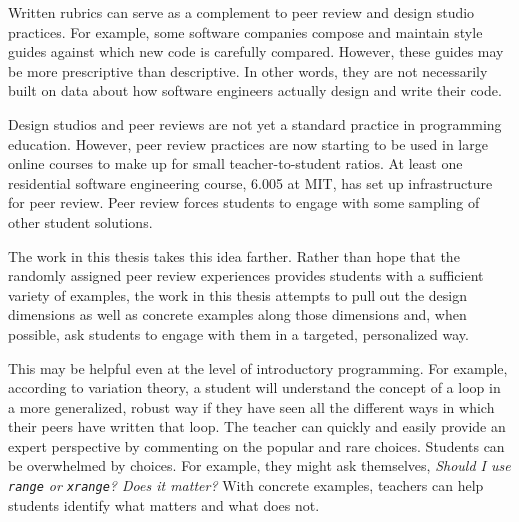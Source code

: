 Written rubrics can serve as a complement to peer review and design studio practices. For example, some software companies compose and maintain style guides against which new code is carefully compared. However, these guides may be more prescriptive than descriptive. In other words, they are not necessarily built on data about how software engineers actually design and write their code. %

Design studios and peer reviews are not yet a standard practice in programming education. However, peer review practices are now starting to be used in large online courses to make up for small teacher-to-student ratios. At least one residential software engineering course, 6.005 at MIT, has set up infrastructure for peer review. Peer review forces students to engage with some sampling of other student solutions. 

The work in this thesis takes this idea farther. Rather than hope that the randomly assigned peer review experiences provides students with a sufficient variety of examples, the work in this thesis attempts to pull out the design dimensions as well as concrete examples along those dimensions and, when possible, ask students to engage with them in a targeted, personalized way. 

This may be helpful even at the level of introductory programming. For example, according to variation theory, a student will understand the concept of a loop in a more generalized, robust way if they have seen all the different ways in which their peers have written that loop. The teacher can quickly and easily provide an expert perspective by commenting on the popular and rare choices. Students can be overwhelmed by choices. For example, they might ask themselves, {\it Should I use \texttt{range} or \texttt{xrange}? Does it matter?} With concrete examples, teachers can help students identify what matters and what does not. 



